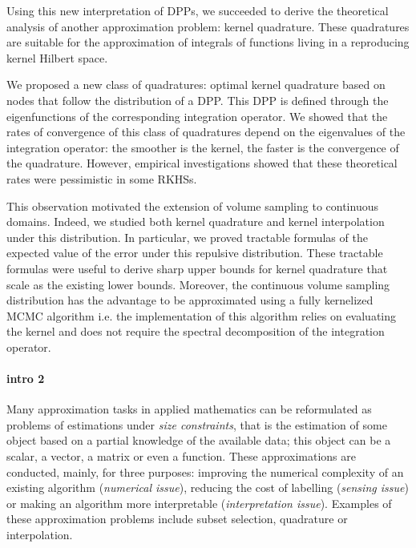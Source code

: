 \documentclass[twoside,11pt]{book}
\numberwithin{theorem}{chapter}
\numberwithin{definition}{chapter}
\numberwithin{proposition}{chapter}
\numberwithin{corollary}{chapter}
\numberwithin{example}{chapter}
\numberwithin{lemma}{chapter}
\numberwithin{assumption}{chapter}
\numberwithin{equation}{chapter}
\numberwithin{figure}{chapter}
\begin{document}
Using this new interpretation of DPPs, we succeeded to derive the theoretical analysis of another approximation problem: kernel quadrature. These quadratures are suitable for the approximation of integrals of functions living in a reproducing kernel Hilbert space.

We proposed a new class of quadratures: optimal kernel quadrature based on nodes that follow the distribution of a DPP. This DPP is defined through the eigenfunctions of the corresponding integration operator. We showed that the rates of convergence of this class of quadratures depend on the eigenvalues of the integration operator: the smoother is the kernel, the faster is the convergence of the quadrature. However, empirical investigations showed that these theoretical rates were pessimistic in some RKHSs. 

This observation motivated the extension of volume sampling to continuous domains. Indeed, we studied both kernel quadrature and kernel interpolation under this distribution. In particular, we proved tractable formulas of the expected value of the error under this repulsive distribution. These tractable formulas were useful to derive sharp upper bounds for kernel quadrature that scale as the existing lower bounds. Moreover, the continuous volume sampling distribution has the advantage to be approximated using a fully kernelized MCMC algorithm i.e. the implementation of this algorithm 
relies on evaluating the kernel and
does not require the spectral decomposition of the integration operator. 



\paragraph{intro 2}

Many approximation tasks in applied mathematics can be reformulated as problems of estimations under \emph{size constraints}, that is the estimation of some object based on a partial knowledge of the available data; this object can be a scalar, a vector, a matrix or even a function. These approximations are conducted, mainly, for three purposes: improving the numerical complexity of an existing algorithm (\emph{numerical issue}), reducing the cost of labelling (\emph{sensing issue}) or making an algorithm more interpretable (\emph{interpretation issue}). Examples of these approximation problems include subset selection, quadrature or interpolation. 
\end{document}
